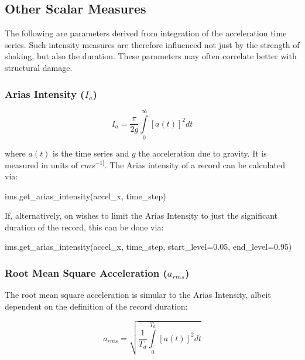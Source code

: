 \subsection{Other Scalar Measures}

The following are parameters derived from integration of the acceleration time series. Such intensity measures are therefore influenced not just by the strength of shaking, but also the duration. These parameters may often correlate better with structural damage.

\subsubsection{Arias Intensity ($I_a$)}

\begin{equation}
I_a =\frac{\pi}{2g} \int\limits_0^{\infty} \left[ {a \left( t \right)}\right]^2 dt
\end{equation}

\noindent where $a \left( t \right)$ is the time series and $g$ the acceleration due to gravity. It is measured in units of $cm s^{-1]}$. The Arias intensity of a record can be calculated via:

\begin{python}
ims.get_arias_intensity(accel_x,
                        time_step)
\end{python}

If, alternatively, on wishes to limit the Arias Intensity to just the significant duration of the record, this can be done via:

\begin{python}
ims.get_arias_intensity(accel_x,
                        time_step,
                        start_level=0.05,
                        end_level=0.95)
\end{python}

\subsubsection{Root Mean Square Acceleration ($a_{rms}$)}

The root mean square acceleration is simular to the Arias Intensity, albeit dependent on the definition of the record duration: 

\begin{equation}
a_{rms} =\sqrt{\frac{1}{T_d}\int\limits_0^{T_d} \left[ {a \left( t \right)}\right]^2 dt}
\end{equation}


